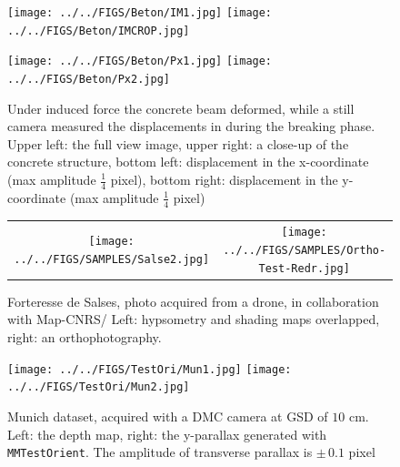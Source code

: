 \documentclass[twocolumn]{bmcart}%
\begin{document}
\begin{backmatter}
\begin{figure}
\begin{center}
 \texttt{[image: ../../FIGS/Beton/IM1.jpg]}
 \texttt{[image: ../../FIGS/Beton/IMCROP.jpg]}
 
 \texttt{[image: ../../FIGS/Beton/Px1.jpg]}
 \texttt{[image: ../../FIGS/Beton/Px2.jpg]}
 
 \end{center}
 \caption{Under induced force the concrete beam deformed, while a still camera measured the displacements in during the breaking phase. Upper left: the full view image, upper right: a close-up of the concrete structure, bottom left: displacement in the x-coordinate (max amplitude $\frac{1}{4}$ pixel), bottom right:  displacement in the y-coordinate (max amplitude $\frac{1}{4}$ pixel)} 
 \label{FIG:OK:Concrete}
\end{figure}

\begin{figure}
 \begin{tabular}{c c}
 \texttt{[image: ../../FIGS/SAMPLES/Salse2.jpg]}&
 \texttt{[image: ../../FIGS/SAMPLES/Ortho-Test-Redr.jpg]} 
  \end{tabular}
 \caption{Forteresse de Salses, photo acquired from a drone, in collaboration
 with Map-CNRS/ Left: hypsometry and shading maps overlapped, right: an orthophotography.}\label{fig:fortress}
 \end{figure}


  \begin{figure}
  \begin{center}
  \texttt{[image: ../../FIGS/TestOri/Mun1.jpg]}
  \texttt{[image: ../../FIGS/TestOri/Mun2.jpg]}
  \end{center}
  \caption{Munich dataset, acquired with a DMC camera at GSD of $10$ cm. Left: the depth map, right: the y-parallax generated with {\tt MMTestOrient}. The amplitude of transverse parallax is $\pm\, 0.1$ pixel
  }
  \label{FIG:Mubich:PxTr}
  \end{figure}


\end{backmatter}
\end{document}
